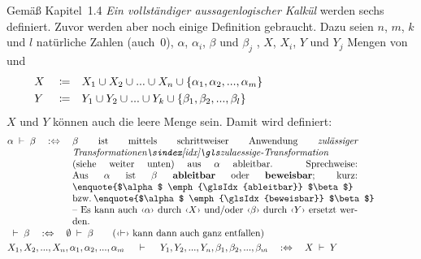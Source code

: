 Gemäß \cite{bib:Rautenberg} Kapitel~1.4 \emph{Ein vollständiger aussagenlogischer Kalkül} werden sechs  definiert. Zuvor werden aber noch einige Definition gebraucht. Dazu seien $n$, $m$, $k$ und $l$ natürliche Zahlen (auch~0), $\alpha$, $\alpha_i$, $\beta$ und $\beta_j$ , $X$, $X_i$, $Y$ und $Y_j$ Mengen von  und
\begin{align}
	&X&&\coloneqq&&X_1\cup X_2\cup...\cup X_n\cup\{\alpha_1,\alpha_2,...,\alpha_m\}
	\\
	&Y&&\coloneqq&&Y_1\cup Y_2\cup...\cup Y_k\cup\{\beta_1, \beta_2, ...,\beta_l \}
	&&&&&&&&&&&&&&&&&&&&
\end{align}
%
$X$ und $Y$ können auch die leere Menge sein. Damit wird definiert:
\begin{align}
	& \alpha \derive \beta \quad \metadefeq \quad
	\parbox[t]{10.5cm}{%
	$\beta$ ist mittels schrittweiser Anwendung \emph{\glsIdxBg{zulaessige-Transformation}{zulässiger Transformationen}} (siehe weiter unten) aus $\alpha$ ableitbar.
	Sprechweise: Aus $\alpha$ ist $\beta$ \defn{ableitbar} oder \defn{beweisbar};
	kurz: \enquote{$\alpha$ \emph{\glsIdx{ableitbar}} $\beta$} \textbzw\ \enquote{$\alpha$ \emph{\glsIdx{beweisbar}} $\beta$}
	-- Es kann auch \chrqt{$\alpha$} durch \chrqt{$X$} und/oder \chrqt{$\beta$} durch \chrqt{$Y$} ersetzt werden.
	}
	\label{def:ableitbar}
	\\
	& \derive \beta \quad \metadefeq \quad \emptyset \derive \beta \qquad \text{(\chrqt{$\derivesym$} kann dann auch ganz entfallen)}
	\\
	&             X_1, X_2, ...,X_n, \alpha_1, \alpha_2, ..., \alpha_m \quad
	\derive \quad Y_1, Y_2, ...,Y_n,  \beta_1,  \beta_2,  ..., \beta_m \quad
	\metadefeq \quad X \derive Y
	\label{def:ableitbarKurz}
	\formulatoleft
\end{align}
%
